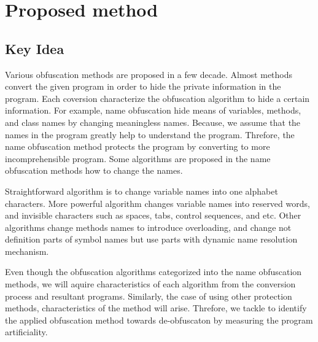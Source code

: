 \documentclass[conference]{IEEEtran}
\begin{document}
\section{Proposed method}\label{sect:method}

\subsection{Key Idea}

Various obfuscation methods are proposed in a few decade.  Almost
methods convert the given program in order to hide the private
information in the program.  Each coversion characterize the
obfuscation algorithm to hide a certain information.
%
For example, name obfuscation hide means of variables, methods, and
class names by changing meaningless names\cite{tyma00patent}.
Because, we assume that the names in the program greatly help to
understand the program.  Threfore, the name obfuscation method
protects the program by converting to more incomprehensible program.
Some algorithms are proposed in the name obfuscation methods how to
change the names.

Straightforward algorithm is to change variable names into one
alphabet characters.  More powerful algorithm changes variable names
into reserved words, and invisible characters such as spaces, tabs,
control sequences, and etc\cite{dasho}.  Other algorithms change
methods names to introduce overloading\cite{tyma00patent}, and change
not definition parts of symbol names but use parts with dynamic name
resolution mechanism\cite{tamada07ieice,tamada08iasted}.

Even though the obfuscation algorithms categorized into the name
obfuscation methods, we will aquire characteristics of each algorithm
from the conversion process and resultant programs.
%
Similarly, the case of using other protection methods, characteristics
of the method will arise.
Threfore, we tackle to identify the applied obfuscation method towards
de-obfuscaton by measuring the program artificiality.
\end{document}
